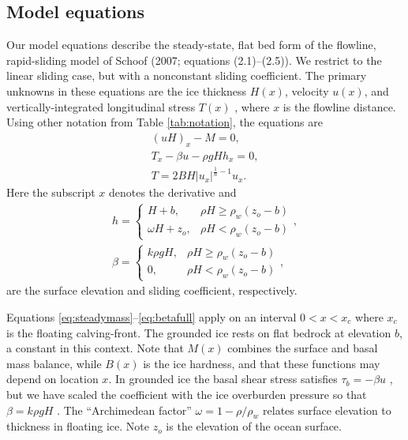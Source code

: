 \documentclass[review,letterpaper]{igs}
\begin{document}
\subsection*{Model equations}  Our model equations describe the steady-state, flat bed form of the flowline, rapid-sliding model of Schoof\nocite{SchoofMarine1} (2007; equations (2.1)--(2.5)).  We restrict to the linear sliding case, but with a nonconstant sliding coefficient.  The primary unknowns in these equations are the ice thickness $H(x)$, velocity $u(x)$, and vertically-integrated longitudinal stress $T(x)$ \citep{SchoofStream}, where $x$ is the flowline distance.  Using other notation from Table \ref{tab:notation}, the equations are
\begin{gather}
(uH)_x - M = 0, \label{eq:steadymass} \\
T_x - \beta u - \rho g H h_x = 0, \label{eq:steadySSA} \\
T = 2 B H |u_x|^{\frac{1}{n}-1} u_x. \label{eq:Tstress}
\end{gather}
Here the subscript $x$ denotes the derivative and
\begin{gather}
h = \begin{cases} H+b,            & \rho H \ge \rho_w (z_o - b) \\
                  \omega H + z_o, & \rho H < \rho_w (z_o - b) \end{cases}, \label{eq:surface} \\
\beta = \begin{cases} k \rho g H,    & \rho H \ge \rho_w (z_o - b) \\
                      0,          & \rho H < \rho_w (z_o - b) \end{cases}, \label{eq:betafull}
\end{gather}
are the surface elevation and sliding coefficient, respectively.

Equations \eqref{eq:steadymass}--\eqref{eq:betafull} apply on an interval $0 < x < x_c$ where $x_c$ is the floating calving-front.  The grounded ice rests on flat bedrock at elevation $b$, a constant in this context.  Note that $M(x)$ combines the surface and basal mass balance, while $B(x)$ is the ice hardness, and that these functions may depend on location $x$.  In grounded ice the basal shear stress satisfies $\tau_b = - \beta u$ \citep{MacAyeal}, but we have scaled the coefficient with the ice overburden pressure so that $\beta = k \rho g H$ \citep{Bodvardsson}.  The ``Archimedean factor'' $\omega = 1 - \rho/\rho_w$ relates surface elevation to thickness in floating ice.  Note $z_o$ is the elevation of the ocean surface.
\end{document}
